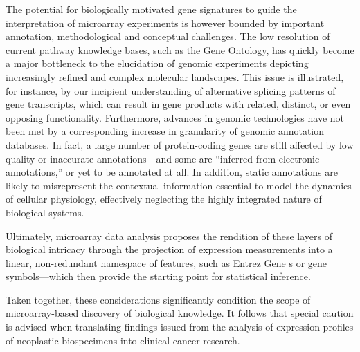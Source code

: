 The potential for biologically motivated gene signatures to guide the
interpretation of microarray experiments is however bounded by important
annotation, methodological and conceptual challenges.  The low resolution of
current pathway knowledge bases, such as the Gene Ontology, has quickly become a
major bottleneck to the elucidation of genomic experiments depicting
increasingly refined and complex molecular landscapes.  This issue is
illustrated, for instance, by our incipient understanding of alternative
splicing patterns of gene transcripts, which can result in gene products with
related, distinct, or even opposing functionality.\cite{wang_alternative_2008}
Furthermore, advances in genomic technologies have not been met by a
corresponding increase in granularity of genomic annotation databases.  In fact,
a large number of protein-coding genes are still affected by low quality or
inaccurate annotations---and some are ``inferred from electronic annotations,''
or yet to be annotated at all.\cite{khatri_ten_2012} In addition, static
annotations are likely to misrepresent the contextual information
essential to model the dynamics of cellular physiology, effectively neglecting
the highly integrated nature of biological systems.

Ultimately, microarray data analysis proposes the rendition of these layers of
biological intricacy through the projection of expression measurements into a
linear, non-redundant namespace of features, such as Entrez Gene s
or  gene symbols---which then provide the starting point for
statistical inference.

\medskip

Taken together, these considerations significantly condition the scope of
microarray-based discovery of biological knowledge.  It follows that special
caution is advised when translating findings issued from the analysis of
expression profiles of neoplastic biospecimens into clinical cancer research.

\clearpage




